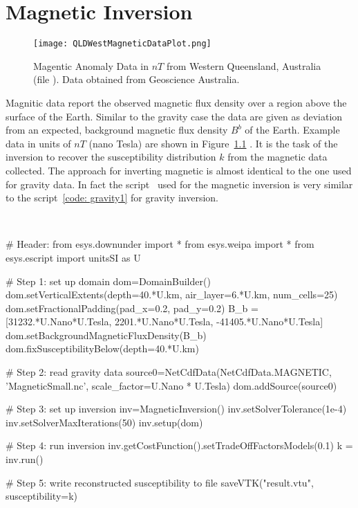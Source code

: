 \chapter{Magnetic Inversion}\label{Chp:cook:magnetic inversion}


\begin{figure}
\centering
\texttt{[image: QLDWestMagneticDataPlot.png]}
\caption{Magentic Anomaly Data in $nT$ from Western Queensland, Australia
    (file ). Data obtained from Geoscience Australia.}
\label{FIG:P1:MAG:0}
\end{figure}

Magnitic data report the observed magnetic flux density over a region above the surface of the Earth. 
Similar to the gravity case the data are given as deviation from an expected, background magnetic flux density $B^b$
of the Earth. Example data in units of $nT$ (nano Tesla) are shown in Figure~\ref{FIG:P1:MAG:0} .
It is the task of the inversion to recover the susceptibility distribution $k$ from the magnetic
data collected. The approach for inverting magnetic is almost identical to the one used for gravity data. 
In fact the \downunder script~ used for the magnetic inversion is very similar to the 
script~\ref{code: gravity1} for gravity inversion.   


\begin{pyc}\label{code: magnetic1}
\
\begin{python}
# Header:
from esys.downunder import *
from esys.weipa import *
from esys.escript import unitsSI as U


# Step 1: set up domain
dom=DomainBuilder()
dom.setVerticalExtents(depth=40.*U.km, air_layer=6.*U.km, num_cells=25)
dom.setFractionalPadding(pad_x=0.2, pad_y=0.2)
B_b = [31232.*U.Nano*U.Tesla, 2201.*U.Nano*U.Tesla, -41405.*U.Nano*U.Tesla]
dom.setBackgroundMagneticFluxDensity(B_b)
dom.fixSusceptibilityBelow(depth=40.*U.km)

# Step 2: read gravity data
source0=NetCdfData(NetCdfData.MAGNETIC, 'MagneticSmall.nc', scale_factor=U.Nano * U.Tesla)
dom.addSource(source0)

# Step 3: set up inversion
inv=MagneticInversion()
inv.setSolverTolerance(1e-4)
inv.setSolverMaxIterations(50)
inv.setup(dom)

# Step 4: run inversion 
inv.getCostFunction().setTradeOffFactorsModels(0.1) 
k = inv.run()

# Step 5: write reconstructed susceptibility to file
saveVTK("result.vtu", susceptibility=k)
\end{python}
\end{pyc}

